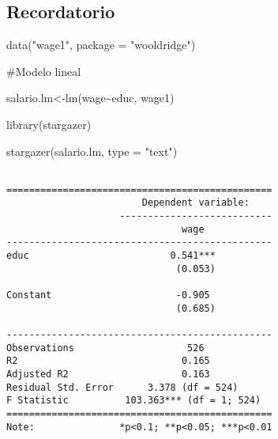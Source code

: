 \documentclass[
  letterpaper,
  DIV=11,
  numbers=noendperiod]{scrreprt}
\newenvironment{Shaded}{\begin{snugshade}}{\end{snugshade}}
\newcommand{\AttributeTok}[1]{\textcolor[rgb]{0.40,0.45,0.13}{#1}}
\newcommand{\CommentTok}[1]{\textcolor[rgb]{0.37,0.37,0.37}{#1}}
\newcommand{\FunctionTok}[1]{\textcolor[rgb]{0.28,0.35,0.67}{#1}}
\newcommand{\NormalTok}[1]{\textcolor[rgb]{0.00,0.23,0.31}{#1}}
\newcommand{\OtherTok}[1]{\textcolor[rgb]{0.00,0.23,0.31}{#1}}
\newcommand{\SpecialCharTok}[1]{\textcolor[rgb]{0.37,0.37,0.37}{#1}}
\newcommand{\StringTok}[1]{\textcolor[rgb]{0.13,0.47,0.30}{#1}}
\begin{document}
\subsection{Recordatorio}\label{recordatorio}

\begin{Shaded}
\begin{Highlighting}[]
\FunctionTok{data}\NormalTok{(}\StringTok{"wage1"}\NormalTok{, }\AttributeTok{package =} \StringTok{"wooldridge"}\NormalTok{)}

\CommentTok{\#Modelo lineal}

\NormalTok{salario.lm}\OtherTok{\textless{}{-}}\FunctionTok{lm}\NormalTok{(wage}\SpecialCharTok{\textasciitilde{}}\NormalTok{educ,}
\NormalTok{               wage1)}

\FunctionTok{library}\NormalTok{(stargazer)}

\FunctionTok{stargazer}\NormalTok{(salario.lm, }
          \AttributeTok{type =} \StringTok{"text"}\NormalTok{)}
\end{Highlighting}
\end{Shaded}

\begin{verbatim}

===============================================
                        Dependent variable:    
                    ---------------------------
                               wage            
-----------------------------------------------
educ                         0.541***          
                              (0.053)          
                                               
Constant                      -0.905           
                              (0.685)          
                                               
-----------------------------------------------
Observations                    526            
R2                             0.165           
Adjusted R2                    0.163           
Residual Std. Error      3.378 (df = 524)      
F Statistic          103.363*** (df = 1; 524)  
===============================================
Note:               *p<0.1; **p<0.05; ***p<0.01
\end{verbatim}
\end{document}
